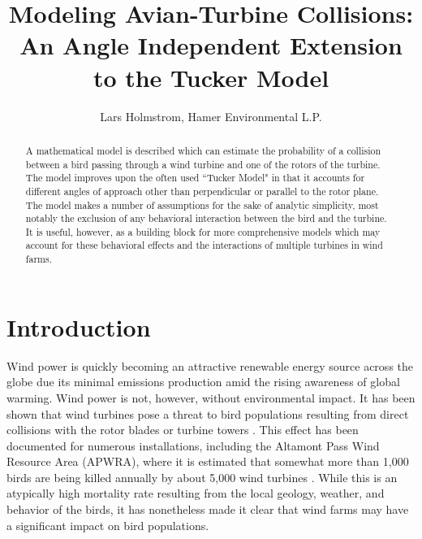 \documentclass[10pt,conference]{IEEEtran}
\begin{document}
\title{Modeling Avian-Turbine Collisions: An Angle Independent Extension to the Tucker Model}
\author{Lars Holmstrom, Hamer Environmental L.P.}
\maketitle

\begin{abstract}
A mathematical model is described which can estimate the probability of a collision between a bird passing through a
wind turbine and one of the rotors of the turbine. The model improves upon the often used ``Tucker Model" in that it
accounts for different angles of approach other than perpendicular or parallel to the rotor plane. The model makes a
number of assumptions for the sake of analytic simplicity, most notably the exclusion of any behavioral interaction
between the bird and the turbine. It is useful, however, as a building block for more comprehensive models which may
account for these behavioral effects and the interactions of multiple turbines in wind farms.
\end{abstract}

\section{Introduction}
Wind power is quickly becoming an attractive renewable energy source across the globe due its minimal emissions
production amid the rising awareness of global warming. Wind power is not, however, without environmental impact. It
has been shown that wind turbines pose a threat to bird populations resulting from direct collisions with the rotor
blades or turbine towers \cite{Johnson2002}\cite{Johnson2004}. This effect has been documented for numerous
installations, including the Altamont Pass Wind Resource Area (APWRA), where it is estimated that somewhat more than
1,000 birds are being killed annually by about 5,000 wind turbines \cite{Thalender2003}. While this is an atypically
high mortality rate resulting from the local geology, weather, and behavior of the birds, it has nonetheless made it
clear that wind farms may have a significant impact on bird populations.
\end{document}
